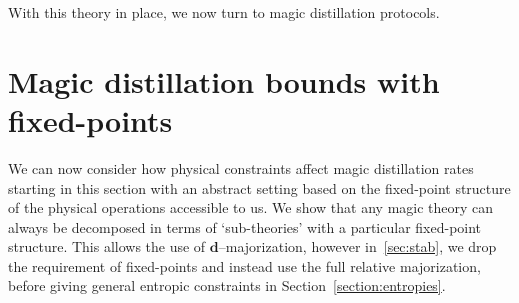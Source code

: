 \documentclass[pra,
aps,
twocolumn,
superscriptaddress,
groupedaddress,
nofootinbib,
reprint
]{revtex4-1}
\begin{document}
With this theory in place, we now turn to magic distillation protocols.

\section{Magic distillation bounds with fixed-points}
\label{sec:frag}

We can now consider how physical constraints affect magic distillation rates starting in this section with an abstract setting based on the fixed-point structure of the physical operations accessible to us. We show that any magic theory can always be decomposed in terms of `sub-theories' with a particular fixed-point structure. This allows the use of $\mathbf{d}$--majorization, however in~\cref{sec:stab}, we drop the requirement of fixed-points and instead use the full relative majorization, before giving general entropic constraints in Section~\ref{section:entropies}.
 
\end{document}

